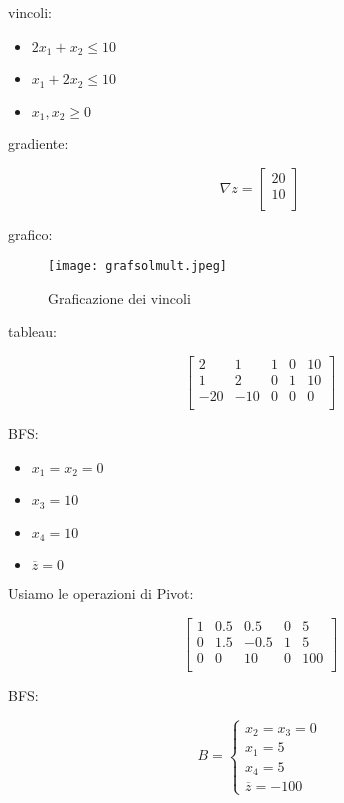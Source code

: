 vincoli:

\begin{itemize}
	\item $2x_1 + x_2 \leq 10$
	\item $x_1 + 2x_2 \leq 10$
	\item $x_1, x_2 \geq 0$
\end{itemize}

gradiente:

$$\nabla z =
\left[ {\begin{array}{c}
	20 \\
	10 \\
\end{array} } \right]
$$

grafico:

\begin{figure}[H]
\centering
\texttt{[image: grafsolmult.jpeg]}
\caption{Graficazione dei vincoli} 
\label{grafsolmult}
\end{figure}

tableau:

$$
\left[ {\begin{array}{ccccc}
	2 & 1 & 1 & 0 & 10\\
	1 & 2 & 0 & 1 & 10\\
	-20 & -10 & 0 & 0 & 0\\
\end{array} } \right]
$$

BFS:

\begin{itemize}
	\item $x_1 = x_2 = 0$
	\item $x_3 = 10$
	\item $x_4 = 10$
	\item $\overline{z} = 0$
\end{itemize}

Usiamo le operazioni di Pivot:

$$
\left[ {\begin{array}{ccccc}
	1 & 0.5 & 0.5 & 0 & 5\\
	0 & 1.5 & -0.5 & 1 & 5\\
	0 & 0 & 10 & 0 & 100\\
\end{array} } \right]
$$

BFS:

$$B =
\begin{cases} 
    x_2 = x_3 = 0 \\ 
    x_1 = 5 \\
	x_4 = 5 \\
	\overline{z} = -100
\end{cases}
$$

